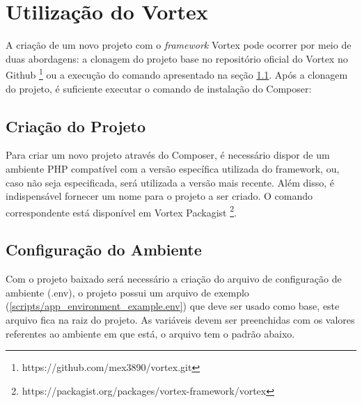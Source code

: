 \chapter{Utilização do Vortex} 
\label{Utilização}

A criação de um novo projeto com o \textit{framework} Vortex pode ocorrer por meio de duas abordagens: a clonagem do projeto base no repositório oficial do Vortex no Github \footnote{https://github.com/mex3890/vortex.git} ou a execução do comando apresentado na seção \ref{packagist_command}. Após a clonagem do projeto, é suficiente executar o comando de instalação do Composer:

\spaceH{}

\label{scripts/clone_vortex_project.bash}

\section{Criação do Projeto}\label{packagist_command}

Para criar um novo projeto através do Composer, é necessário dispor de um ambiente PHP compatível com a versão específica utilizada do framework, ou, caso não seja especificada, será utilizada a versão mais recente. Além disso, é indispensável fornecer um nome para o projeto a ser criado. O comando correspondente está disponível em Vortex Packagist \footnote{https://packagist.org/packages/vortex-framework/vortex}.

\spaceH{}

\label{scripts/create_project_from_packagist.bash}

\section{Configuração do Ambiente}

Com o projeto baixado será necessário a criação do arquivo de configuração de ambiente (.env), o projeto possui um arquivo de exemplo (\ref{scripts/app_environment_example.env}) que deve ser usado como base, este arquivo fica na raiz do projeto. As variáveis devem ser preenchidas com os valores referentes ao ambiente em que está, o arquivo tem o padrão abaixo.

\spaceH{}

\label{scripts/app_environment_example.env}


